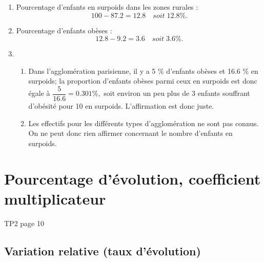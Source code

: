 \documentclass[12pt,a4paper]{article}
\begin{document}
\begin{enumerate}[label=\arabic*. ]
	\item  Pourcentage d'enfants en surpoids dans les zones rurales :
	\begin{equation*}
		\num{100} - \num{87.2} = \num{12.8} \quad soit \; \num{12.8} \%.
	\end{equation*}
	
	\medskip 
	
	\item  Pourcentage d'enfants obèses :
	\begin{equation*}
		\num{12.8} - \num{9.2} = \num{3.6} \quad soit \; \num{3.6} \%.
	\end{equation*}
	
	\item \begin{enumerate}[label=\alph*)]
		\item Dans l'agglomération parisienne, il y a \num{5} \% d'enfants obèses et \num{16.6} \% en surpoids; la proportion d'enfants obèses parmi ceux en surpoids est donc égale à $\dfrac{5}{\num{16.6}}=\num{0.301} \%,$ soit environ un peu plus de 3 enfants souffrant d'obésité pour 10 en surpoids. L'affirmation est donc juste.
		
		\item Les effectifs pour les différents types d'agglomération ne sont pas connus. On ne peut donc rien affirmer concernant le nombre d'enfants en surpoids.
	\end{enumerate}
	
	
\end{enumerate}

\section{Pourcentage d'évolution, coefficient multiplicateur}

TP2 page 10

\subsection{Variation relative (taux d'évolution)}
\end{document}
